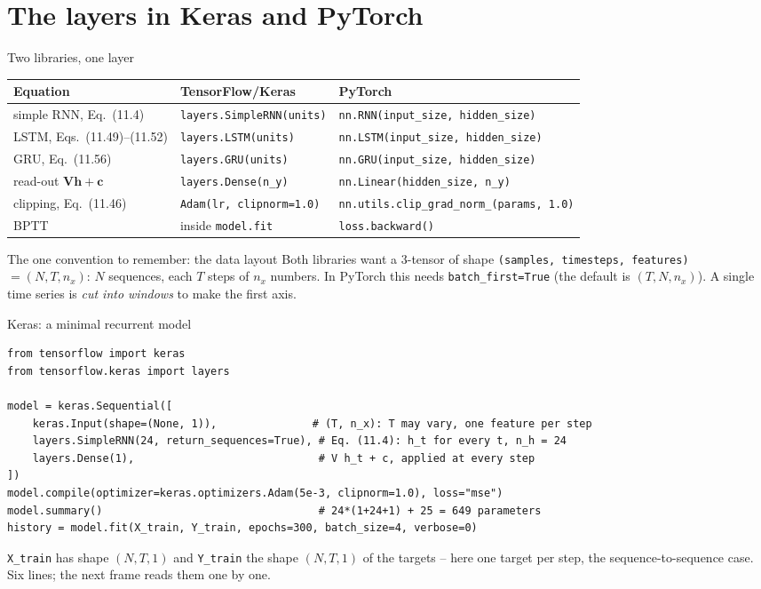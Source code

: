 \documentclass[10pt,aspectratio=169]{beamer}
\begin{document}
\section{The layers in Keras and PyTorch}
\begin{frame}{Two libraries, one layer}
\begin{center}
\footnotesize
\begin{tabular}{lll}
\toprule
Equation & TensorFlow/Keras & PyTorch\\
\midrule
simple RNN, Eq.~(11.4) & \texttt{layers.SimpleRNN(units)} & \texttt{nn.RNN(input\_size, hidden\_size)}\\
LSTM, Eqs.~(11.49)--(11.52) & \texttt{layers.LSTM(units)} & \texttt{nn.LSTM(input\_size, hidden\_size)}\\
GRU, Eq.~(11.56) & \texttt{layers.GRU(units)} & \texttt{nn.GRU(input\_size, hidden\_size)}\\
read-out $\bm{V}\bm{h}+\bm{c}$ & \texttt{layers.Dense(n\_y)} & \texttt{nn.Linear(hidden\_size, n\_y)}\\
clipping, Eq.~(11.46) & \texttt{Adam(lr, clipnorm=1.0)} & \texttt{nn.utils.clip\_grad\_norm\_(params, 1.0)}\\
BPTT & inside \texttt{model.fit} & \texttt{loss.backward()}\\
\bottomrule
\end{tabular}
\end{center}
\begin{block}{The one convention to remember: the data layout}
Both libraries want a 3-tensor of shape \texttt{(samples, timesteps,
features)} $=(N,T,n_x)$: $N$ sequences, each $T$ steps of $n_x$ numbers.
In PyTorch this needs \texttt{batch\_first=True} (the default is
$(T,N,n_x)$).  A single time series is \emph{cut into windows} to make the
first axis.
\end{block}
\end{frame}

\begin{frame}[fragile]{Keras: a minimal recurrent model}
\begin{lstlisting}
from tensorflow import keras
from tensorflow.keras import layers

model = keras.Sequential([
    keras.Input(shape=(None, 1)),               # (T, n_x): T may vary, one feature per step
    layers.SimpleRNN(24, return_sequences=True), # Eq. (11.4): h_t for every t, n_h = 24
    layers.Dense(1),                             # V h_t + c, applied at every step
])
model.compile(optimizer=keras.optimizers.Adam(5e-3, clipnorm=1.0), loss="mse")
model.summary()                                  # 24*(1+24+1) + 25 = 649 parameters
history = model.fit(X_train, Y_train, epochs=300, batch_size=4, verbose=0)
\end{lstlisting}
\small
\texttt{X\_train} has shape $(N,T,1)$ and \texttt{Y\_train} the shape
$(N,T,1)$ of the targets -- here one target per step, the
sequence-to-sequence case.  Six lines; the next frame reads them one by one.
\end{frame}
\end{document}
